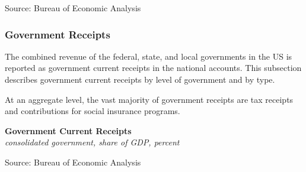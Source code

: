 \documentclass{report}
\makeatletter
\newcommand{\tbllink}[1]{\href{https://raw.githubusercontent.com/bdecon/US-chartbook/master/chartbook/data/#1}{\faTable}}
\newcommand*\short[1]{\expandafter\@gobbletwo\number\numexpr#1\relax}
\newcommand{\dateaxisticks}{
		date coordinates in=x, axis line style={draw=none},
		xmax={2023-11-30},
		max space between ticks=40,	    
		xtick={{1990-01-01}, {1992-01-01}, {1994-01-01}, 
			{1996-01-01}, {1998-01-01}, {2000-01-01}, 
			{2002-01-01}, {2004-01-01}, {2006-01-01},
			{2008-01-01}, {2010-01-01}, {2012-01-01}, {2014-01-01},
		    {2016-01-01}, {2018-01-01}, {2020-01-01}, {2022-01-01}, 
		    {2024-01-01}, {2026-01-01}},
		minor xtick={{1989-01-01}, {1991-01-01}, {1993-01-01},
			{1995-01-01}, {1997-01-01}, {1999-01-01}, 
			{2001-01-01}, {2003-01-01}, {2005-01-01}, {2007-01-01},
		    {2009-01-01}, {2011-01-01}, {2013-01-01}, {2015-01-01},
		    {2017-01-01}, {2019-01-01}, {2021-01-01}, {2023-01-01}, 
		    {2025-01-01}, {2027-01-01}},
		enlarge y limits={0.06}, enlarge x limits={0.01},
		xticklabel style={align=center, yshift=-2pt}, tick label style={inner sep=0pt},
		}
\newcommand{\bbar}[2]{extra #1 ticks = {{#2}}, extra #1 tick labels = ,
		extra #1 tick style = {grid=major, grid style={thick, black!25}},}
\newcommand{\stdline}[4]{\addplot[very thick, no markers, color=#1] 
		table [x=#2, y=#3, col sep=comma] {#4};	}
\newcommand{\thickline}[4]{\addplot[ultra thick, no markers, color=#1] 
		table [x=#2, y=#3, col sep=comma] {#4};	}
\newcommand{\rbars}{
		\fill[color=black!10] (axis cs:{1990-07-01},\pgfkeysvalueof{/pgfplots/ymin}) rectangle 
			(axis cs:{1991-03-01}, \pgfkeysvalueof{/pgfplots/ymax});
		\fill[color=black!10] (axis cs:{2007-12-01},\pgfkeysvalueof{/pgfplots/ymin}) rectangle 
			(axis cs:{2009-07-01}, \pgfkeysvalueof{/pgfplots/ymax});
		\fill[color=black!10] (axis cs:{2001-03-01},\pgfkeysvalueof{/pgfplots/ymin}) rectangle 
			(axis cs:{2001-11-01}, \pgfkeysvalueof{/pgfplots/ymax});
		\fill[color=black!10] (axis cs:{2020-02-01},\pgfkeysvalueof{/pgfplots/ymin}) rectangle 
			(axis cs:{2020-05-01}, \pgfkeysvalueof{/pgfplots/ymax});}
\makeatother
\begin{document}
{\begin{minipage}{0.76\textwidth}
\footnotesize{Source: Bureau of Economic Analysis}
\end{minipage} 
\newpage
\vspace*{-10mm}

\begin{minipage}{0.76\textwidth}
\subsubsection*{Government Receipts} 
\small The combined revenue of the federal, state, and local governments in the US is reported as government current receipts in the national accounts. This subsection describes government current receipts by level of government and by type. 

At an aggregate level, the vast majority of government receipts are tax receipts and contributions for social insurance programs. 
\vspace{0.5mm}

\normalsize \textbf{Government Current Receipts}\\
\footnotesize{\textit{consolidated government, share of GDP, percent}}
\vspace{2.95cm}

\hspace{3mm} 

\footnotesize{Source: Bureau of Economic Analysis} \hfill \tbllink{gov_rec_overview.csv}
\vspace{4.5mm}


\end{minipage}}
\end{document}

